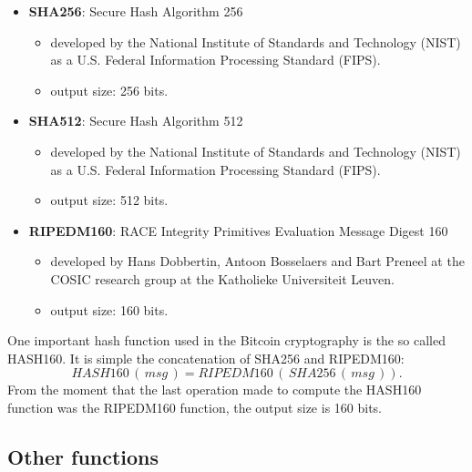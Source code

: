 \begin{itemize}
	\item \textbf{SHA256}: Secure Hash Algorithm 256
	\begin{itemize}
		\item developed by the National Institute of Standards and Technology (NIST) as a U.S. Federal Information Processing Standard (FIPS).
		\item output size: 256 bits.
	\end{itemize}
	\item \textbf{SHA512}: Secure Hash Algorithm 512
	\begin{itemize}
		\item developed by the National Institute of Standards and Technology (NIST) as a U.S. Federal Information Processing Standard (FIPS).
		\item output size: 512 bits.
	\end{itemize}
	\item \textbf{RIPEDM160}: RACE Integrity Primitives Evaluation Message Digest 160
	\begin{itemize}
		\item developed by Hans Dobbertin, Antoon Bosselaers and Bart Preneel at the COSIC research group at the Katholieke Universiteit Leuven. 
		\item output size: 160 bits.
	\end{itemize}
\end{itemize}
One important hash function used in the Bitcoin cryptography is the so called HASH160. It is simple the concatenation of SHA256 and RIPEDM160:
\begin{equation*}
HASH160 \, (\, msg\, ) = RIPEDM160\, (\, SHA256 \, (\, msg \, )).
\end{equation*}
From the moment that the last operation made to compute the HASH160 function was the RIPEDM160 function, the output size is 160 bits.

\subsection{Other functions}


